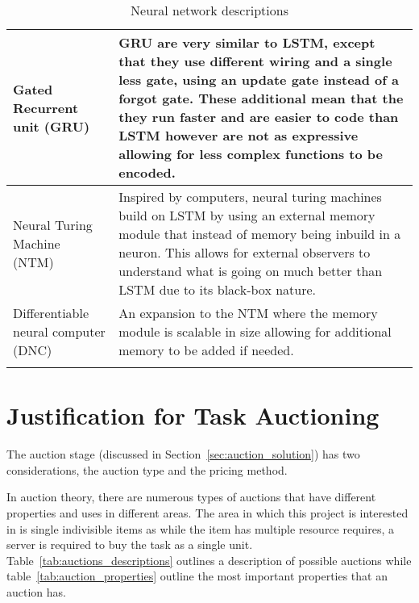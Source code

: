 \begin{longtable}{|p{3.5cm}|p{11cm}|}
    Gated Recurrent unit (GRU)~\cite{GRU} & GRU are very similar to LSTM, except that they use different wiring and a
        single less gate, using an update gate instead of a forgot gate. These additional mean that the they run faster
        and are easier to code than LSTM however are not as expressive allowing for less complex functions to be
        encoded. \\ \hline

    Neural Turing Machine (NTM)~\cite{NTM} & Inspired by computers, neural turing machines build on LSTM by using an
        external memory module that instead of memory being inbuild in a neuron. This allows for external observers to
        understand what is going on much better than LSTM due to its black-box nature. \\ \hline

    Differentiable neural computer (DNC)~\cite{DNC} & An expansion to the NTM where the memory module is scalable in
        size allowing for additional memory to be added if needed. \\ \hline

    \caption{Neural network descriptions}
    \label{tab:neural_network_description}
\end{longtable}

\section{Justification for Task Auctioning}\label{sec:justification-for-task-auctioning}
The auction stage (discussed in Section~\ref{sec:auction_solution}) has two considerations, the auction type and the pricing method.

In auction theory, there are numerous types of auctions that have different properties and uses in different areas.
The area in which this project is interested in is single indivisible items as while the item has multiple resource
requires, a server is required to buy the task as a single unit. Table~\ref{tab:auctions_descriptions} outlines a
description of possible auctions while table~\ref{tab:auction_properties} outline the most important properties that
an auction has.

